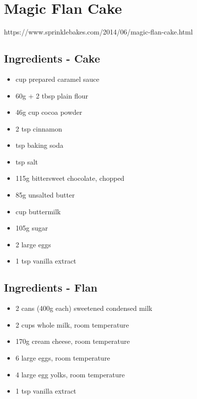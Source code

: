 \section{Magic Flan Cake}
  https://www.sprinklebakes.com/2014/06/magic-flan-cake.html
  \begin{multicols}{2}
    \subsection{Ingredients - Cake}
      \begin{itemize}
        \item {} cup prepared caramel sauce
        \item 60g + 2 tbsp plain flour
        \item 46g cup cocoa powder
        \item 2 tsp cinnamon
        \item {} tsp baking soda
        \item {} tsp salt
        \item 115g bittersweet chocolate, chopped
        \item 85g unsalted butter
        \item {} cup buttermilk
        \item 105g sugar
        \item 2 large eggs
        \item 1 tsp vanilla extract
      \end{itemize}
      \subsection{Ingredients - Flan}
        \begin{itemize}
          \item 2 cans (400g each) sweetened condensed milk
          \item 2 cups whole milk, room temperature
          \item 170g cream cheese, room temperature
          \item 6 large eggs, room temperature
          \item 4 large egg yolks, room temperature
          \item 1 tsp vanilla extract
        \end{itemize}
  \vfill\null
  \columnbreak

\end{multicols}
